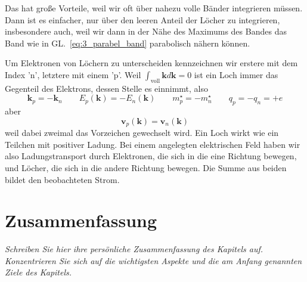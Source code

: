 Das hat große Vorteile, weil wir oft über nahezu volle Bänder integrieren müssen. Dann ist es einfacher, nur über den leeren Anteil der Löcher zu integrieren, insbesondere auch, weil wir dann in der Nähe des Maximums des Bandes das Band wie in GL.~\ref{eq:3_parabel_band} parabolisch nähern können.

Um Elektronen von Löchern zu unterscheiden kennzeichnen wir erstere mit dem Index 'n', letztere mit einem 'p'. Weil $\int_\text{voll} \mathbf{k} d\mathbf{k} = 0$ ist ein Loch immer das Gegenteil des Elektrons, dessen Stelle es einnimmt, also
\begin{equation}
   \mathbf{k}_p = - \mathbf{k}_n \quad \quad E_p(\mathbf{k}) = - E_n(\mathbf{k}) \quad \quad m^\star_p = - m^\star_n
   \quad \quad q_p = - q_n = + e
\end{equation} 
aber
\begin{equation}
   \mathbf{v}_p (\mathbf{k}) = \mathbf{v}_n (\mathbf{k}) 
\end{equation}
weil dabei zweimal das Vorzeichen gewechselt wird. Ein Loch wirkt wie ein Teilchen mit positiver Ladung. Bei einem angelegten elektrischen Feld haben wir also Ladungstransport durch Elektronen, die sich in die eine Richtung bewegen, und Löcher, die sich in die andere Richtung bewegen. Die Summe aus beiden bildet den beobachteten Strom.


\newpage
\section{Zusammenfassung}

\textit{Schreiben Sie hier ihre persönliche Zusammenfassung des Kapitels auf. Konzentrieren Sie sich auf die wichtigsten Aspekte und die am Anfang genannten Ziele des Kapitels.}

 \vspace*{10cm}

\printbibliography[segment=\therefsegment,heading=subbibliography]
